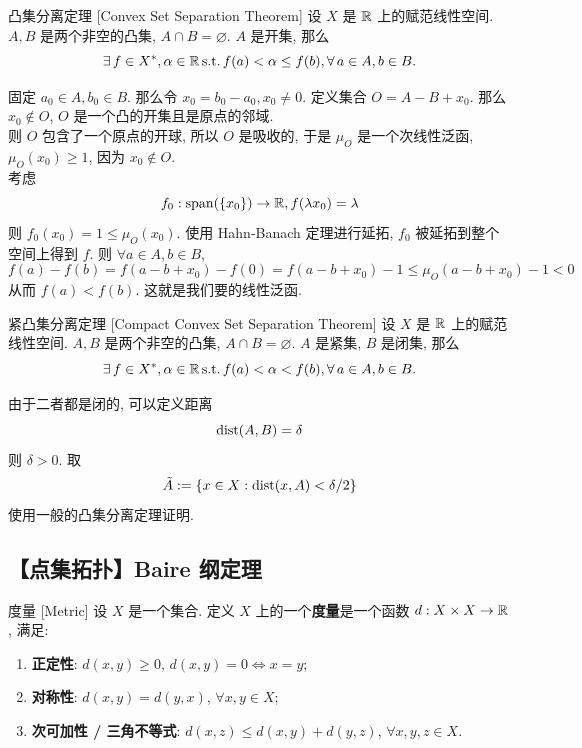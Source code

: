        \begin{thm}
            {凸集分离定理}
            [Convex Set Separation Theorem]
            设 \(X\) 是 \(\operatorname{\mathbb{R}}\) 上的赋范线性空间. \(A, B\) 是两个非空的凸集, \(A\cap B=\varnothing\). \(A\) 是开集, 那么 
            \[\exists\,f\in X^*, \alpha\in\operatorname{\mathbb{R}} \operatorname{\text{s.t.}} f(a)<\alpha\leq f(b), \forall\,a\in A, b\in B.\]
        \end{thm}

        \begin{prf}
            固定 \(a_0\in A, b_0\in B\). 那么令 \(x_0=b_0-a_0, x_0\neq 0\). 定义集合 \(O=A-B+x_0\). 那么 \(x_0\notin O\), \(O\) 是一个凸的开集且是原点的邻域.\\
            则 \(O\) 包含了一个原点的开球, 所以 \(O\) 是吸收的, 于是 \(\mu_O\) 是一个次线性泛函, \(\mu_O(x_0)\geq 1\), 因为 \(x_0\notin O\). \\
            考虑
            \[f_0: \operatorname{span}(\{x_0\})\to\operatorname{\mathbb{R}}, f(\lambda x_0)=\lambda  \]
            则 \(f_0(x_0)=1\leq \mu_O(x_0)\). 使用 Hahn-Banach 定理进行延拓, \(f_0\) 被延拓到整个空间上得到 \(f\). 则 \(\forall a\in A, b\in B\), 
            \[f(a)-f(b)= f(a-b+x_0)-f(0)= f(a-b+x_0)-1\leq \mu_O(a-b+x_0)-1< 0\]
            从而 \(f(a)<f(b)\). 这就是我们要的线性泛函.
        \end{prf}

        \begin{thm}
            {紧凸集分离定理}
            [Compact Convex Set Separation Theorem]
            设 \(X\) 是 \(\operatorname{\mathbb{R}}\) 上的赋范线性空间. \(A, B\) 是两个非空的凸集, \(A\cap B=\varnothing\). \(A\) 是紧集, \(B\) 是闭集, 那么
            \[\exists\,f\in X^*, \alpha\in\operatorname{\mathbb{R}} \operatorname{\text{s.t.}} f(a)<\alpha< f(b), \forall\,a\in A, b\in B.\] 
        \end{thm}

        \begin{prf}
            由于二者都是闭的, 可以定义距离
            \[\operatorname{dist}(A,B)=\delta\]
            则 \(\delta>0\). 取
            \[\tilde{A}:=\{x\in X: \operatorname{dist}(x,A)<\delta/2\}\]
            使用一般的凸集分离定理证明.
        \end{prf}

    \subsection{【点集拓扑】Baire 纲定理}

        \begin{dfn}
            [metric]
            {度量}
            [Metric]
            设 \(X\) 是一个集合. 定义 \(X\) 上的一个\textbf{度量}是一个函数 \(d:X\times X\to\operatorname{\mathbb{R}}\), 满足:
            \begin{enumerate}[label=(\roman*)]
                \item \textbf{正定性}: \(d(x,y)\geq 0\), \(d(x,y)=0\iff x=y\);
                \item \textbf{对称性}: \(d(x,y)=d(y,x)\), \(\forall x,y\in X\);
                \item \textbf{次可加性 / 三角不等式}: \(d(x,z)\leq d(x,y)+d(y,z)\), \(\forall x,y,z\in X\).
            \end{enumerate}
        \end{dfn}

